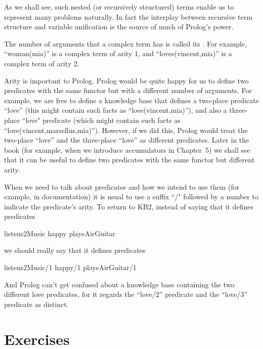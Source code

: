As we shall see, such nested (or recursively structured) terms enable
us to represent many problems naturally.  In fact the interplay
between recursive term structure and variable unification is the source
of much of Prolog's power.


The number of arguments that a complex term has is called its
.  For example, ``woman(mia)'' is a complex term of
arity 1, and ``loves(vincent,mia)'' is a complex term of arity 2.


Arity is important to Prolog.  Prolog would be quite happy for us to
define two predicates with the same functor but with a different
number of arguments.  For example, we are free to define a knowledge
base that defines a two-place predicate ``love'' (this might contain
such facts as ``love(vincent,mia)''), and also a three-place ``love"
predicate (which might contain such facts as
``love(vincent,marsellus,mia)''). However, if we did this, Prolog would
treat the two-place ``love'' and the three-place ``love'' as different
predicates. Later in the book (for example, when we introduce
accumulators in Chapter~5) we shall see that it can be useful to
define two predicates with the same functor but different arity.

When we need to talk about predicates and how we intend to use them
(for example, in documentation) it is usual to use a suffix ``/"
followed by a number to indicate the predicate's arity.  To return to
KB2, instead of saying that it defines predicates
%
\begin{LPNcodedisplay}
listens2Music
happy
playsAirGuitar
\end{LPNcodedisplay}
%
we should really say that it defines predicates
%
\begin{LPNcodedisplay}
listens2Music/1
happy/1
playsAirGuitar/1
\end{LPNcodedisplay}
And Prolog can't get confused about a knowledge base containing the
two different love predicates, for it regards the ``love/2'' predicate
and the ``love/3'' predicate as distinct.



\section{Exercises}\label{SEC.L1.EXERCISES}

